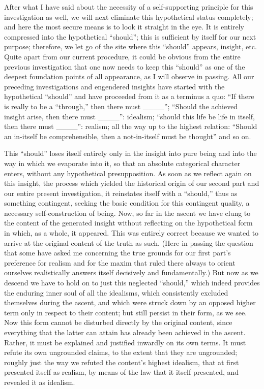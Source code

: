 After what I have said about the necessity
of a self-supporting principle for this investigation as well,
we will next eliminate this hypothetical status completely;
and here the most secure means is to look it straight in the eye.
It is entirely compressed into the hypothetical “should”;
this is sufficient by itself for our next purpose;
therefore, we let go of the site where this “should” appears, insight, etc.
Quite apart from our current procedure,
it could be obvious from the entire previous investigation
that one now needs to keep this
“should” as one of the deepest foundation points of all appearance,
as I will observe in passing.
All our preceding investigations and engendered
insights have started with the hypothetical “should”
and have proceeded from it as a terminus a quo:
“If there is really to be a “through,” then there must ____”;
“Should the achieved insight arise, then there must ____”: idealism;
“should this life be life in itself, then there must ____”: realism;
all the way up to the highest relation:
“Should an in-itself be comprehensible,
then a not-in-itself must be thought” and so on.

This “should” loses itself entirely
only in the insight into pure being
and into the way in which we evaporate into it,
so that an absolute categorical character enters,
without any hypothetical presupposition.
As soon as we reflect again on this insight,
the process which yielded the historical origin
of our second part and our entire present investigation,
it reinstates itself with a “should,”
thus as something contingent,
seeking the basic condition for this contingent quality,
a necessary self-construction of being.
Now, so far in the ascent we have clung to
the content of the generated insight without reflecting
on the hypothetical form in which, as a whole, it appeared.
This was entirely correct because we wanted to arrive
at the original content of the truth as such.
(Here in passing the question that some have asked me concerning
the true grounds for our first part's preference for realism and
for the maxim that ruled there always to orient ourselves realistically
answers itself decisively and fundamentally.)
But now as we descend we have to hold on
to just this neglected “should,”
which indeed provides the enduring
inner soul of all the idealisms,
which consistently excluded themselves during the ascent,
and which were struck down by an opposed higher term
only in respect to their content;
but still persist in their form, as we see.
Now this form cannot be disturbed
directly by the original content,
since everything that the latter can attain
has already been achieved in the ascent.
Rather, it must be explained
and justified inwardly on its own terms.
It must refute its own ungrounded claims,
to the extent that they are ungrounded;
roughly just the way we refuted
the content's highest idealism,
that at first presented itself as realism,
by means of the law that it itself presented,
and revealed it as idealism.

